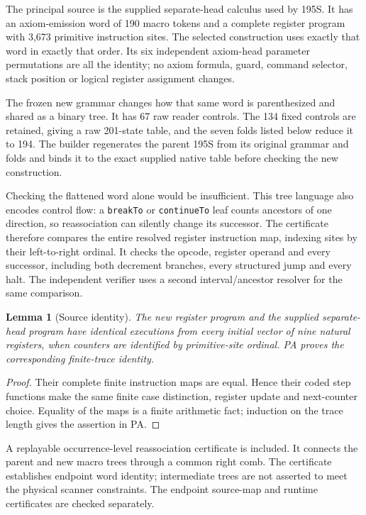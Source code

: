 \documentclass[11pt,letterpaper]{article}
\newcommand{\file}[1]{\texttt{\nolinkurl{#1}}}
\newtheorem{lemma}[theorem]{Lemma}
\begin{document}
The principal source is the supplied separate-head calculus used by 195S.
It has an axiom-emission word of 190 macro tokens and a complete register
program with 3,673 primitive instruction sites. The selected construction
uses exactly that word in exactly that order. Its six independent axiom-head
parameter permutations are all the identity; no axiom formula, guard,
command selector, stack position or logical register assignment changes.

The frozen new grammar changes how that same word is parenthesized and
shared as a binary tree. It has 67 raw reader controls. The 134 fixed
controls are retained, giving a raw 201-state table, and the seven folds
listed below reduce it to 194. The builder regenerates the parent 195S
from its original grammar and folds and binds it to the exact supplied
native table before checking the new construction.

Checking the flattened word alone would be insufficient. This tree language
also encodes control flow: a \file{breakTo} or \file{continueTo} leaf counts
ancestors of one direction, so reassociation can silently change its
successor. The certificate therefore compares the entire resolved register
instruction map, indexing sites by their left-to-right ordinal. It checks
the opcode, register operand and every successor, including both decrement
branches, every structured jump and every halt. The independent verifier
uses a second interval/ancestor resolver for the same comparison.

\begin{lemma}[Source identity]
\label{lem:source}
The new register program and the supplied separate-head program have
identical executions from every initial vector of nine natural registers,
when counters are identified by primitive-site ordinal. PA proves the
corresponding finite-trace identity.
\end{lemma}
\begin{proof}
Their complete finite instruction maps are equal. Hence their coded step
functions make the same finite case distinction, register update and
next-counter choice. Equality of the maps is a finite arithmetic fact;
induction on the trace length gives the assertion in PA.
\end{proof}

A replayable occurrence-level reassociation certificate is included. It
connects the parent and new macro trees through a common right comb.
The certificate establishes endpoint word identity; intermediate trees
are not asserted to meet the physical scanner constraints. The endpoint
source-map and runtime certificates are checked separately.
\end{document}
